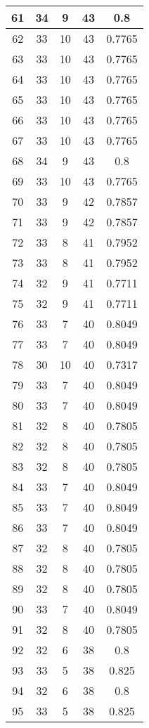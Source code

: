 \documentclass[letterpaper, 12pt]{article}
\begin{document}
\begin{longtable}{|c|c|c|c|c|}
\hline
61 & 34 & 9 & 43 & 0.8 \\
\hline
62 & 33 & 10 & 43 & 0.7765 \\
\hline
63 & 33 & 10 & 43 & 0.7765 \\
\hline
64 & 33 & 10 & 43 & 0.7765 \\
\hline
65 & 33 & 10 & 43 & 0.7765 \\
\hline
66 & 33 & 10 & 43 & 0.7765 \\
\hline
67 & 33 & 10 & 43 & 0.7765 \\
\hline
68 & 34 & 9 & 43 & 0.8 \\
\hline
69 & 33 & 10 & 43 & 0.7765 \\
\hline
70 & 33 & 9 & 42 & 0.7857 \\
\hline
71 & 33 & 9 & 42 & 0.7857 \\
\hline
72 & 33 & 8 & 41 & 0.7952 \\
\hline
73 & 33 & 8 & 41 & 0.7952 \\
\hline
74 & 32 & 9 & 41 & 0.7711 \\
\hline
75 & 32 & 9 & 41 & 0.7711 \\
\hline
76 & 33 & 7 & 40 & 0.8049 \\
\hline
77 & 33 & 7 & 40 & 0.8049 \\
\hline
78 & 30 & 10 & 40 & 0.7317 \\
\hline
79 & 33 & 7 & 40 & 0.8049 \\
\hline
80 & 33 & 7 & 40 & 0.8049 \\
\hline
81 & 32 & 8 & 40 & 0.7805 \\
\hline
82 & 32 & 8 & 40 & 0.7805 \\
\hline
83 & 32 & 8 & 40 & 0.7805 \\
\hline
84 & 33 & 7 & 40 & 0.8049 \\
\hline
85 & 33 & 7 & 40 & 0.8049 \\
\hline
86 & 33 & 7 & 40 & 0.8049 \\
\hline
87 & 32 & 8 & 40 & 0.7805 \\
\hline
88 & 32 & 8 & 40 & 0.7805 \\
\hline
89 & 32 & 8 & 40 & 0.7805 \\
\hline
90 & 33 & 7 & 40 & 0.8049 \\
\hline
91 & 32 & 8 & 40 & 0.7805 \\
\hline
92 & 32 & 6 & 38 & 0.8 \\
\hline
93 & 33 & 5 & 38 & 0.825 \\
\hline
94 & 32 & 6 & 38 & 0.8 \\
\hline
95 & 33 & 5 & 38 & 0.825 \\

\end{longtable}
\end{document}

